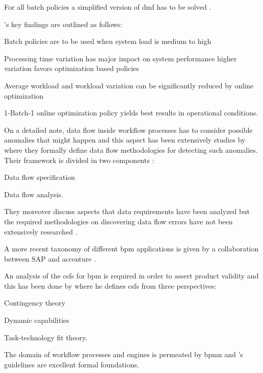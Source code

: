 \documentclass[draft=false]{seal_thesis}
\begin{document}
For all batch policies a simplified version of \gls{dmf} has to be solved \citep{Zeng2005}.

\citet{Zeng2005}'s key findings are outlined as follows:
\begin{enumerate*}
	\item Batch policies are to be used when system load is medium to high
	\item Processing time variation has major impact on system performance \ie higher variation favors optimization based policies
	\item Average workload and workload variation can be significantly reduced by online optimization
	\item 1-Batch-1 online optimization policy yields best results in operational conditions.
\end{enumerate*}

On a detailed note, data flow inside workflow processes has to consider possible anomalies that might happen and this aspect has been extensively studies by \citet{Sun2006} where they formally define data flow methodologies for detecting such anomalies. Their framework is divided in two components \citep{Sun2006}:
\begin{enumerate*}
	\item Data flow specification
	\item Data flow analysis.
\end{enumerate*}

They moreover discuss aspects that data requirements have been analyzed but the required methodologies on discovering data flow errors have not been extensively researched \citep{Sun2006}.

A more recent taxonomy of different \gls{bpm} applications is given by a collaboration between SAP and accenture \citep{EvolvedTechnologist2009}.

An analysis of the \glspl{csf} for \gls{bpm} is required in order to assert product validity and this has been done by \citet{Trkman2010} where he defines \glspl{csf} from three perspectives:
\begin{enumerate*}
	\item Contingency theory
	\item Dynamic capabilities
	\item Task-technology fit theory.
\end{enumerate*}

The domain of workflow processes and engines is permeated by \gls{bpmn} and \citet{Silver2011}'s guidelines are excellent formal foundations.
\end{document}
